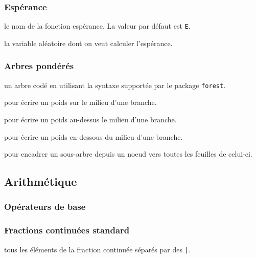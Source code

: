 \documentclass[12pt,a4paper]{article}
\theoremstyle{definition}
\newcommand\extraspace{
	\vspace{0.25em}
}
\begin{document}
\subsubsection{Espérance}


\IDoption{} le nom de la fonction espérance. La valeur par défaut est \verb+E+.

\IDarg{} la variable aléatoire dont on veut calculer l'espérance.
\subsubsection{Arbres pondérés}



\Content{} un arbre codé en utilisant la syntaxe supportée par le package \verb+forest+.

 pour écrire un poids sur le milieu d'une branche.

 pour écrire un poids au-dessus le milieu d'une branche.

 pour écrire un poids en-dessous du milieu d'une branche.

 pour encadrer un sous-arbre depuis un noeud vers toutes les feuilles de celui-ci.
\subsection{Arithmétique}

\subsubsection{Opérateurs de base}



\extraspace


\extraspace

\subsubsection{Fractions continuées standard}



\IDarg{} tous les éléments de la fraction continuée séparés par des \verb+|+.
\end{document}
